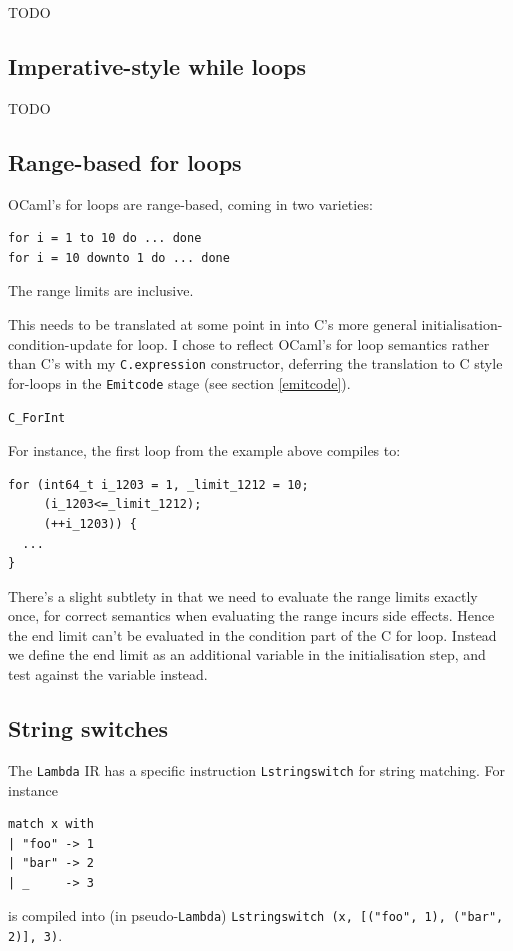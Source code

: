\documentclass[12pt,a4paper,twoside,openright]{report}
\begin{document}
TODO

\subsection{Imperative-style while loops}\label{while-loops}

TODO

\subsection{Range-based for loops}\label{for-loops}

OCaml's for loops are range-based, coming in two varieties:
\begin{lstlisting}
for i = 1 to 10 do ... done
for i = 10 downto 1 do ... done
\end{lstlisting}

The range limits are inclusive.

This needs to be translated at some point in into C's more general
initialisation-condition-update for loop. I chose to reflect OCaml's for loop
semantics rather than C's with my \lstinline!C.expression!
constructor, deferring the translation to C style for-loops in the
\lstinline!Emitcode! stage (see section \ref{emitcode}).

\lstinline!C_ForInt!

For instance, the first loop from the example above
compiles to:

\begin{lstlisting}
for (int64_t i_1203 = 1, _limit_1212 = 10;
     (i_1203<=_limit_1212);
     (++i_1203)) {
  ...
}
\end{lstlisting}

There's a slight subtlety in that we need to evaluate the range limits exactly
once, for correct semantics when evaluating the range incurs side effects.
Hence the end limit can't be evaluated in the condition part of the C for loop.
Instead we define the end limit as an additional variable in the initialisation
step, and test against the variable instead.

\subsection{String switches}\label{stringswitch}

The \lstinline!Lambda! IR has a specific instruction \lstinline!Lstringswitch!
for string matching. For instance
\begin{lstlisting}
match x with
| "foo" -> 1
| "bar" -> 2
| _     -> 3\end{lstlisting}
is compiled into (in pseudo-\lstinline!Lambda!)
\lstinline!Lstringswitch (x, [("foo", 1), ("bar", 2)], 3)!.
\end{document}
